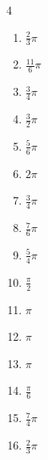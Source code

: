 \begin{multicols}{4}
\begin{enumerate}
  \item $\displaystyle \frac{2}{3}\pi$

  \item $\displaystyle \frac{11}{6}\pi$

  \item $\displaystyle \frac{3}{4}\pi$

  \item $\displaystyle \frac{3}{2}\pi$

  \item $\displaystyle \frac{5}{6}\pi$

  \item $\displaystyle 2\pi$

  \item $\displaystyle \frac{3}{4}\pi$

  \item $\displaystyle \frac{7}{6}\pi$

  \item $\displaystyle \frac{5}{4}\pi$

  \item $\displaystyle \frac{\pi}{2}$

  \item $\displaystyle \pi$

  \item $\displaystyle \pi$

  \item $\displaystyle \pi$

\columnbreak %

\resetques

  \item $\displaystyle \frac{\pi}{6}$

  \item $\displaystyle \frac{7}{4}\pi$

  \item $\displaystyle \frac{2}{3}\pi$


\end{enumerate}
\end{multicols}
